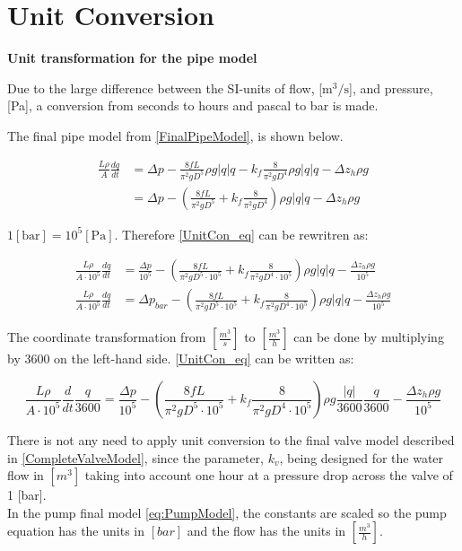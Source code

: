 \chapter{Unit Conversion}
\label{unitCON}
\textbf{Unit transformation for the pipe model}

Due to the large difference between the SI-units of flow, [$\text{m}^3/\text{s}$], and pressure, [Pa], a conversion from seconds to hours and pascal to bar is made.

The final pipe model from \eqref{FinalPipeModel}, is shown below.   

\begin{equation}
\begin{split}
   \frac{L \rho}{A} \frac{dq}{dt} &=\Delta p - \frac{8fL}{\pi^{2}gD^5} \rho g  |q| q - k_f \frac{8}{\pi^2gD^4} \rho g |q| q - \Delta z_h \rho g \\
   &=\Delta p - (\frac{8fL}{\pi^{2}gD^5} + k_f \frac{8}{\pi^2gD^4}) \rho g |q| q - \Delta z_h \rho g
\end{split}
\label{UnitCon_eq}
\end{equation}

$1 [\text{bar}] = 10^5[\text{Pa}]$. Therefore \eqref{UnitCon_eq} can be rewritren as: 

\begin{equation}
\begin{split}
   \frac{L \rho}{A\cdot10^5} \frac{dq}{dt} &=  \frac{\Delta p}{10^5} - (\frac{8fL}{\pi^{2}gD^5\cdot10^5} + k_f \frac{8}{\pi^2gD^4\cdot10^5}) \rho g |q| q - \frac{\Delta z_h \rho g}{10^5}\\
   \frac{L \rho}{A\cdot10^5} \frac{dq}{dt} &= \Delta p_{bar} - (\frac{8fL}{\pi^{2}gD^5\cdot10^5} + k_f \frac{8}{\pi^2gD^4\cdot10^5}) \rho g |q| q - \frac{\Delta z_h \rho g}{10^5}
\end{split}
\end{equation}

The coordinate transformation from $[\frac{m^3}{s}]$ to $[\frac{m^3}{h}]$ can be done by multiplying by 3600 on the left-hand side. \eqref{UnitCon_eq} can be written as:

\begin{equation}
   \frac{L \rho}{A\cdot10^5} \frac{d}{dt}\frac{q}{3600} = \frac{\Delta p}{10^5} - (\frac{8fL}{\pi^{2}gD^5\cdot10^5} + k_f \frac{8}{\pi^2gD^4\cdot10^5}) \rho g \frac{|q|}{3600} \frac{q}{3600} - \frac{\Delta z_h \rho g}{10^5}
\end{equation}

There is not any need to apply unit conversion to the final valve model described in \eqref{CompleteValveModel}, since the parameter, $k_v$, being designed for the water flow in $[m^3]$ taking into account one hour at a pressure drop across the valve of 1 [bar]. 
\\
In the pump final model \eqref{eq:PumpModel}, the constants are scaled so the pump equation has the units in $[bar]$ and the flow has the units in $[\frac{m^3}{h}]$.

